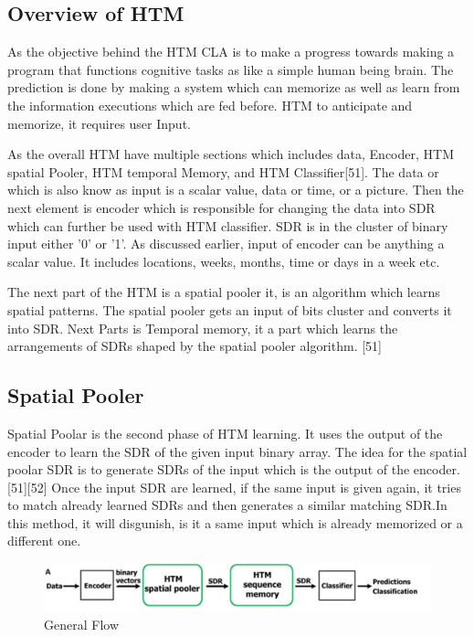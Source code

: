 \documentclass[conference]{IEEEtran}
\begin{document}
\subsection{Overview of HTM}
As the objective behind the HTM CLA is to make a progress towards making a program that functions cognitive tasks as like a simple human being brain. The prediction is done by making a system which can memorize as well as learn from the information executions which are fed before. HTM to anticipate and memorize, it requires user Input. 

As the overall HTM have multiple sections which includes data, Encoder, HTM spatial Pooler, HTM temporal Memory, and HTM Classifier[51]. The data or which is also know as input is a scalar value, data or time, or a picture. Then the next element is encoder which is responsible for changing the data into SDR which can further be used with HTM classifier. SDR is in the cluster of binary input either '0' or '1'. As discussed earlier, input of encoder can be anything a scalar value. It includes locations, weeks, months, time or days in a week etc. 

The next part of the HTM is a spatial pooler it, is an algorithm which learns spatial patterns. The spatial pooler gets an input of bits cluster and converts it into SDR. Next Parts is Temporal memory, it a part which learns the arrangements of SDRs shaped by the spatial pooler algorithm. [51]  


\subsection{Spatial Pooler}
Spatial Poolar is the second phase of HTM learning. It uses the output of the encoder to learn the SDR of the given input binary array. The idea for the spatial poolar SDR is to generate SDRs of the input which is the output of the encoder.[51][52] Once the input SDR are learned, if the same input is given again, it tries to match already learned SDRs and then generates a similar matching SDR.In this method, it will disgunish, is it a same input which is already memorized or a different one.   


\begin{figure}[h]
\includegraphics[scale=.40]{HtmPipeline.png}
\caption{General Flow}
\label{fig:enter-label}
\end{figure}
\end{document}
